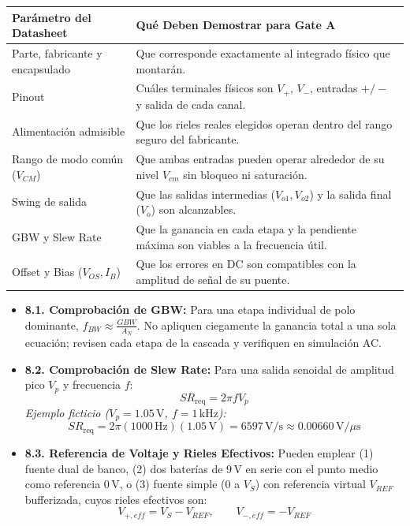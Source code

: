 \documentclass[10pt, a4paper]{article}
\begin{document}
\begin{table}[htbp]
    \centering
    \footnotesize
    \renewcommand{\arraystretch}{1.25}
    \begin{tabularx}{\textwidth}{|>{\raggedright\arraybackslash}p{4.8cm}|>{\raggedright\arraybackslash}X|}
    \hline
    \rowcolor[HTML]{EFEFEF} 
    \textbf{Parámetro del Datasheet} & \textbf{Qué Deben Demostrar para Gate A} \\ \hline
    Parte, fabricante y encapsulado & Que corresponde exactamente al integrado físico que montarán. \\ \hline
    Pinout & Cuáles terminales físicos son $V_+$, $V_-$, entradas $+/-\,$ y salida de cada canal. \\ \hline
    Alimentación admisible & Que los rieles reales elegidos operan dentro del rango seguro del fabricante. \\ \hline
    Rango de modo común ($V_{CM}$) & Que ambas entradas pueden operar alrededor de su nivel $V_{cm}$ sin bloqueo ni saturación. \\ \hline
    Swing de salida & Que las salidas intermedias ($V_{o1}, V_{o2}$) y la salida final ($V_o$) son alcanzables. \\ \hline
    GBW y Slew Rate & Que la ganancia en cada etapa y la pendiente máxima son viables a la frecuencia útil. \\ \hline
    Offset y Bias ($V_{OS}, I_B$) & Que los errores en DC son compatibles con la amplitud de señal de su puente. \\ \hline
    \end{tabularx}
\end{table}

\begin{itemize}
    \setlength{\itemsep}{2pt}
    \item \textbf{8.1. Comprobación de GBW:} Para una etapa individual de polo dominante, $f_{BW} \approx \frac{GBW}{A_N}$. No apliquen ciegamente la ganancia total a una sola ecuación; revisen cada etapa de la cascada y verifiquen en simulación AC.
    \item \textbf{8.2. Comprobación de Slew Rate:} Para una salida senoidal de amplitud pico $V_p$ y frecuencia $f$:
    \begin{equation}
        \boxed{SR_{\mathrm{req}} = 2\pi f V_p}
    \end{equation}
    \textit{Ejemplo ficticio ($V_p=1.05\,\text{V}$, $f=1\,\text{kHz}$):}
    \begin{equation*}
        SR_{\mathrm{req}} = 2\pi(1000\,\text{Hz})(1.05\,\text{V}) = 6597\,\text{V/s} \approx 0.00660\,\text{V}/\mu\text{s}
    \end{equation*}
    \item \textbf{8.3. Referencia de Voltaje y Rieles Efectivos:} Pueden emplear (1) fuente dual de banco, (2) dos baterías de $9\,\text{V}$ en serie con el punto medio como referencia $0\,\text{V}$, o (3) fuente simple ($0$ a $V_S$) con referencia virtual $V_{REF}$ bufferizada, cuyos rieles efectivos son:
    \begin{equation}
        V_{+,eff} = V_S - V_{REF}, \qquad V_{-,eff} = -V_{REF}
    \end{equation}
\end{itemize}
\end{document}
